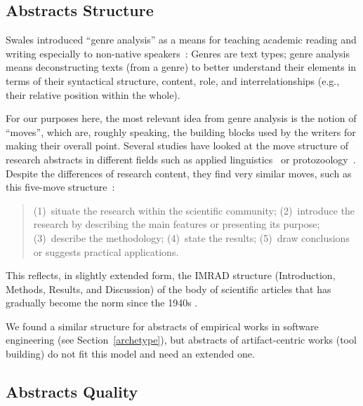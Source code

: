 \documentclass[10pt,journal,compsoc]{IEEEtran}
\begin{document}
\subsection{Abstracts Structure}

Swales introduced ``genre analysis'' as a means for teaching academic reading and writing
especially to non-native speakers~\cite{Swales90}:
Genres are text types;
genre analysis means deconstructing texts (from a genre) to better understand
their elements in
terms of their syntactical structure, content, role, and interrelationships
(e.g., their relative position within the whole).

For our purposes here, the most relevant idea from genre analysis is the notion
of ``moves'', which are, roughly speaking, the building blocks used by the writers
for making their overall point.
Several studies have looked at the move structure of research abstracts
in different fields such as
applied linguistics~\cite{DosSantos96} or
protozoology~\cite{CroOpp06}.
Despite the differences of research content, they find very similar moves,
such as this five-move structure~\cite{CroOpp06}:
\begin{quote}
	(1)~situate the research within the scientific community;
	(2)~introduce the research by describing the main features or presenting its purpose;
	(3)~describe the methodology;
	(4)~state the results;
	(5)~draw conclusions or suggests practical applications.
\end{quote}
This reflects, in slightly extended form, the IMRAD structure 
(Introduction, Methods, Results, and Discussion) of the body of scientific articles
that has gradually become the norm since the 1940s \cite{SolPer04}.

We found a similar structure for abstracts of 
empirical works in software engineering (see Section~\ref{archetype}),
but abstracts of artifact-centric works (tool building) do not fit this model and need
an extended one.


\subsection{Abstracts Quality}\label{relatedworkquality}
\end{document}
